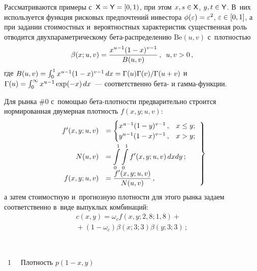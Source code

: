 \begin{multicols}{2}
  Рассматриваются примеры с~${\sf X}\hm= {\sf Y}\hm= [0,1)$, при этом $x, 
s\hm\in {\sf X}$, $y,t\hm\in {\sf Y}$. В~них используется функция рисковых 
предпочтений инвестора $\phi(\varepsilon)\hm=\varepsilon^2$, 
$\varepsilon\hm\in [0, 1]$, а при задании стоимостных и~вероятностных 
характеристик существенная роль отводится двухпараметрическому 
бе\-та-рас\-пре\-де\-ле\-нию $\mathrm{Be}(u, v)$ с~плотностью
  $$
  \beta(x;u,v)\hm=\fr{x^{u-1}(1-x)^{v-1}}{B(u,v)} \,,\enskip u, v>0\,,
  $$
где 
     $B(u,v)\hm= \int\nolimits_0^1 x^{u-1} (1\hm-x)^{v-1}\,dx 
     \hm= \Gamma(u)\Gamma(v)/\Gamma(u\hm+v)$
и~$\Gamma(u)\hm= \int\nolimits_0^{\infty} x^{u\hm-1} \exp(-x)\,dx$~--- 
соответственно бе\-та- и гам\-ма-функ\-ции. 

  Для рынка \#0 с~помощью бе\-та-плот\-ности предварительно строится 
нормированная двумерная плотность $f(x,y; u,v)$: 
 \begin{equation}
 \left.
 \begin{array}{rl}
  f^\prime (x,y; u,v)&=
\begin{cases} 
x^{u-1}(1-y)^{v-1}\,, & x\leq y;\\
   y^{u-1}(1-x)^{v-1}\,,& x>y;\end{cases}
  \\[12pt]
  N(u,v)&=\displaystyle\int\limits_0^1 \int\limits_0^1 f^\prime (x,y;u,v)\,dxdy\,;\\[6pt]
  f(x,y;u,v)&=\displaystyle\frac{\displaystyle f^\prime(x,y; u,v)\mathstrut}{\displaystyle N(u,v)\mathstrut}\,,
  \end{array}
  \right\}
  \label{e19-ags}
  \end{equation}
  а затем стоимостную и~прогнозную плотности для этого рынка задаем 
соответственно в~виде вы\-пук\-лых комбинаций: 
  \begin{multline}
  c(x,y)=\omega_c f(x,y;2{,}8;1{,}8)+{}\\
  {}+(1-\omega_c)\beta(x;3;3)\beta(y;3;3)\,; 
\label{e20-ags}
  \end{multline}
  
  
  { \begin{center}  %
 \vspace*{-1pt}
    \mbox{%
 \epsfxsize=76.396mm 
 }


\vspace*{6pt}

\noindent
{{\figurename~1}\ \ \small{
Плотность $p(1 - x, y)$
}}
\end{center}}


\end{multicols}
